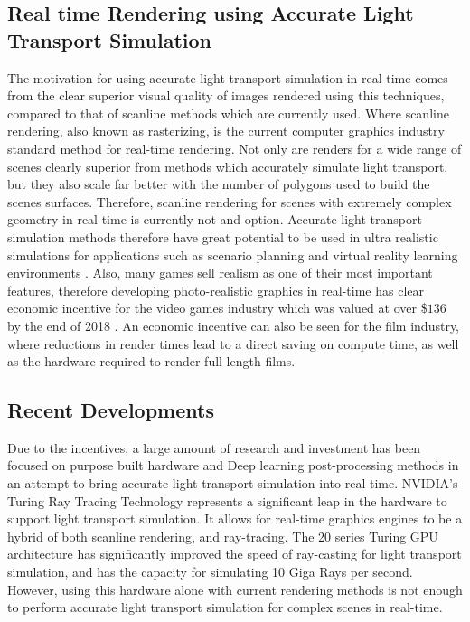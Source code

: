 \documentclass[../dissertation.tex]{subfiles}
\begin{document}
\subsection{Real time Rendering using Accurate Light Transport Simulation}
The motivation for using accurate light transport simulation in real-time 
comes from the clear superior visual quality of images rendered using this 
techniques, compared to that of scanline methods which are currently used. 
Where scanline rendering, also known as rasterizing, is the current computer 
graphics industry standard method for real-time rendering. Not only are 
renders for a wide range of scenes clearly superior from methods which 
accurately simulate light transport, but they also scale far better with the 
number of polygons used to build the scenes surfaces. Therefore, scanline 
rendering for scenes with extremely complex geometry in real-time is currently 
not and option. Accurate light transport simulation methods therefore have 
great potential to be used in ultra realistic simulations for applications such 
as scenario planning and virtual reality learning environments \cite{pan2006virtual}. 
Also, many games sell realism as one of their most important features, therefore 
developing photo-realistic graphics in real-time has clear economic incentive for 
the video games industry which was valued at over \$$136$ by the end of 2018 
\cite{bloomberg.com}. An economic incentive can also be seen for the film
industry, where reductions in render times lead to a direct saving on compute 
time, as well as the hardware required to render full length films.

\subsection{Recent Developments}
Due to the incentives, a large amount of research and investment has been focused 
on purpose built hardware and Deep learning  post-processing methods in an 
attempt to bring accurate light transport simulation into real-time. NVIDIA's 
Turing Ray Tracing Technology \cite{nvidia_turing_architecture_whitepaper_2018} 
represents a significant leap in the hardware to support light transport simulation. 
It allows for real-time graphics engines to be a hybrid of both scanline rendering, 
and ray-tracing. The 20 series Turing GPU architecture has significantly improved 
the speed of ray-casting for light transport simulation, and has the capacity for  
simulating 10 Giga Rays per second. However, using this hardware alone with 
current rendering methods is not enough to perform accurate light transport 
simulation for complex scenes in real-time.\\
\end{document}
